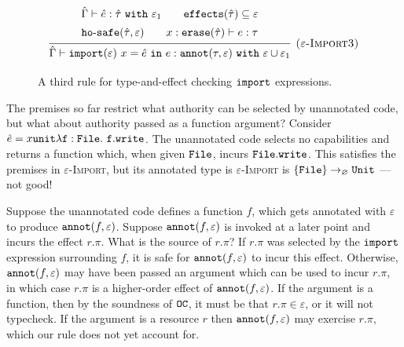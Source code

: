 \begin{figure}[h]

\noindent
{}

\[
\begin{array}{c}

\infer[\textsc{($\varepsilon$-Import3)}]
	{ \hat \Gamma \vdash \kwa{import}(\varepsilon)~x = \hat e~\kw{in} e: \kwa{annot}(\tau, \varepsilon)~\kw{with} \varepsilon \cup \varepsilon_1 }
{{\def\arraystretch{1.4}
  \begin{array}{c}
\hat \Gamma \vdash \hat e: \hat \tau~\kw{with} \varepsilon_1
~~~~~~
\kwa{effects}(\hat \tau) \subseteq \varepsilon \\
\hosafe{\hat \tau}{\varepsilon} ~~~~~~ x: \kwa{erase}(\hat \tau) \vdash e: \tau
  \end{array}}} 
 
\end{array}
\]

\vspace{-7pt}
\caption{A third rule for type-and-effect checking $\mathtt{import}$ expressions.}
\label{fig:import_rule3}
\end{figure}

The premises so far restrict what authority can be selected by unannotated code, but what about authority passed as a function argument? Consider $\hat e = {x}{\mathtt{unit}}{\mathtt{\lambda f: { File }.~f.write}}$. The unannotated code selects no capabilities and returns a function which, when given $\mathtt{File}$, incurs $\mathtt{File.write}$. This satisfies the premises in \textsc{$\varepsilon$-Import}, but its annotated type is \textsc{$\varepsilon$-Import} is $\{ \mathtt{File} \} \rightarrow_{\varnothing} \mathtt{Unit}$ --- not good!

Suppose the unannotated code defines a function $f$, which gets annotated with $\varepsilon$ to produce $\mathtt{annot}(f, \varepsilon)$. Suppose $\mathtt{annot}(f, \varepsilon)$ is invoked at a later point and incurs the effect $r.\pi$. What is the source of $r.\pi$? If $r.\pi$ was selected by the $\mathtt{import}$ expression surrounding $f$, it is safe for $\mathtt{annot}(f, \varepsilon)$ to incur this effect. Otherwise, $\mathtt{annot}(f, \varepsilon)$ may have been passed an argument which can be used to incur $r.\pi$, in which case $r.\pi$ is a higher-order effect of $\mathtt{annot}(f, \varepsilon)$. If the argument is a function, then by the soundness of $\mathtt{OC}$, it must be that $r.\pi \in \varepsilon$, or it will not typecheck. If the argument is a resource $r$ then $\mathtt{annot}(f, \varepsilon)$ may exercise $r.\pi$, which our rule does not yet account for.



